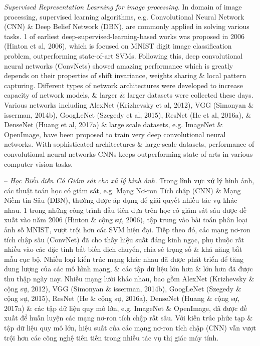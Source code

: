 \documentclass{article}
\begin{document}
\begin{itemize}
\begin{itemize}
\begin{itemize}
            {\it Supervised Representation Learning for image processing.} In domain of image processing, supervised learning algorithms, e.g. Convolutional Neural Network (CNN) \& Deep Belief Network (DBN), are commonly applied in solving various tasks. 1 of earliest deep-supervised-learning-based works was proposed in 2006 (Hinton et al, 2006), which is focused on MNIST digit image classification problem, outperforming state-of-art SVMs. Following this, deep convolutional neural networks (ConvNets) showed amazing performance which is greatly depends on their properties of shift invariance, weights sharing \& local pattern capturing. Different types of network architectures were developed to increase capacity of network models, \& larger \& larger datasets were collected these days. Various networks including AlexNet (Krizhevsky et al, 2012), VGG (Simonyan \& isserman, 2014b), GoogLeNet (Szegedy et al, 2015), ResNet (He et al, 2016a), \& DenseNet (Huang et al, 2017a) \& large scale datasets, e.g. ImageNet \& OpenImage, have been proposed to train very deep convolutional neural networks. With sophisticated architectures \& large-scale datasets, performance of convolutional neural networks CNNs keeps outperforming state-of-arts in various computer vision tasks.

            -- {\it Học Biểu diễn Có Giám sát cho xử lý hình ảnh.} Trong lĩnh vực xử lý hình ảnh, các thuật toán học có giám sát, e.g. Mạng Nơ-ron Tích chập (CNN) \& Mạng Niềm tin Sâu (DBN), thường được áp dụng để giải quyết nhiều tác vụ khác nhau. 1 trong những công trình đầu tiên dựa trên học có giám sát sâu được đề xuất vào năm 2006 (Hinton \& cộng sự, 2006), tập trung vào bài toán phân loại ảnh số MNIST, vượt trội hơn các SVM hiện đại. Tiếp theo đó, các mạng nơ-ron tích chập sâu (ConvNet) đã cho thấy hiệu suất đáng kinh ngạc, phụ thuộc rất nhiều vào các đặc tính bất biến dịch chuyển, chia sẻ trọng số \& khả năng bắt mẫu cục bộ. Nhiều loại kiến trúc mạng khác nhau đã được phát triển để tăng dung lượng của các mô hình mạng, \& các tập dữ liệu lớn hơn \& lớn hơn đã được thu thập ngày nay. Nhiều mạng lưới khác nhau, bao gồm AlexNet (Krizhevsky \& cộng sự, 2012), VGG (Simonyan \& isserman, 2014b), GoogLeNet (Szegedy \& cộng sự, 2015), ResNet (He \& cộng sự, 2016a), DenseNet (Huang \& cộng sự, 2017a) \& các tập dữ liệu quy mô lớn, e.g. ImageNet \& OpenImage, đã được đề xuất để huấn luyện các mạng nơ-ron tích chập rất sâu. Với kiến trúc phức tạp \& tập dữ liệu quy mô lớn, hiệu suất của các mạng nơ-ron tích chập (CNN) vẫn vượt trội hơn các công nghệ tiên tiến trong nhiều tác vụ thị giác máy tính.


\end{itemize}
\end{itemize}
\end{itemize}
\end{document}
